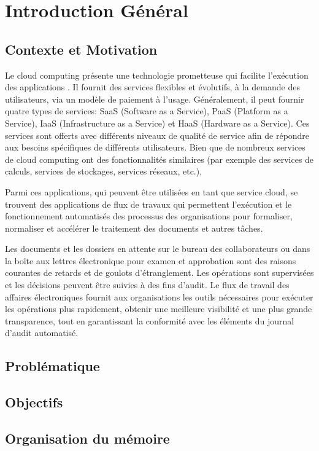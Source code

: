 \chapter*{Introduction Général }


\section*{Contexte et Motivation} 
Le cloud computing  présente une technologie prometteuse qui facilite l'exécution des applications . Il fournit des services flexibles et évolutifs, à la demande des utilisateurs, via un modèle de paiement à l'usage. Généralement, il peut fournir quatre types de services: SaaS (Software as a Service), PaaS (Platform as a Service), IaaS (Infrastructure as a Service) et HaaS (Hardware as a Service). Ces services sont offerts avec différents niveaux de qualité de service afin de répondre aux besoins spécifiques de différents utilisateurs. Bien que de nombreux services de cloud computing  ont des fonctionnalités similaires (par exemple des services de calculs, services de stockages, services  réseaux, etc.),

Parmi ces applications, qui peuvent être  utilisées en tant que service cloud, se trouvent des applications de flux de travaux  qui permettent l'exécution et le fonctionnement automatisés des processus des organisations pour formaliser, normaliser et accélérer le traitement des documents et autres tâches.

 Les documents et les dossiers en attente sur le bureau des collaborateurs ou dans la boîte aux lettres électronique pour examen et approbation sont des raisons courantes de retards et de goulots d'étranglement. Les opérations sont supervisées et les décisions peuvent être suivies à des fins d'audit. Le flux de travail des affaires électroniques fournit aux organisations les outils nécessaires pour exécuter les opérations plus rapidement, obtenir une meilleure visibilité et une plus grande transparence, tout en garantissant la conformité avec les éléments du journal d'audit automatisé.


\section*{Problématique}


 
\section*{Objectifs}


\section*{Organisation du mémoire}